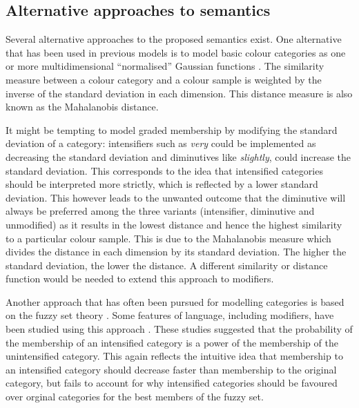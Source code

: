
\subsection{Alternative approaches to semantics}

Several alternative approaches to the proposed semantics exist. One
alternative that has been used in previous models is to model basic
colour categories as one or more multidimensional ``normalised''
Gaussian functions \citep{lammens94computational,
  steels05coordinating}. The similarity measure between a colour
category and a colour sample is weighted by the inverse of the
standard deviation in each dimension. This distance measure is also
known as the Mahalanobis distance.

It might be tempting to model graded membership by modifying the
standard deviation of a category: intensifiers such as \textit{very} could
be implemented as decreasing the standard deviation and diminutives
like \textit{slightly}, could increase the standard deviation. This
corresponds to the idea that intensified categories should be
interpreted more strictly, which is reflected by a lower standard
deviation. This however leads to the unwanted outcome that the
diminutive will always be preferred among the three variants
(intensifier, diminutive and unmodified) as it results in the lowest
distance and hence the highest similarity to a particular colour
sample. This is due to the Mahalanobis measure which divides the
distance in each dimension by its standard deviation. The higher the
standard deviation, the lower the distance. A different similarity or
distance function would be needed to extend this approach to
modifiers.

Another approach that has often been pursued for modelling categories
is based on the fuzzy set theory \citep{kay78linguistic,
  benavente08parametric}. Some features of language, including
modifiers, have been studied using this approach
\citep{hersh76fuzzy}. These studies suggested that the probability of
the membership of an intensified category is a power of the membership
of the unintensified category. This again reflects the intuitive idea
that membership to an intensified category should decrease faster than
membership to the original category, but fails to account for why
intensified categories should be favoured over orginal categories for
the best members of the fuzzy set.

